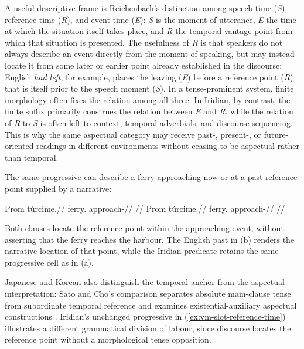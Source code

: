 A useful descriptive frame is Reichenbach's distinction among speech time
(\textit{S}), reference time (\textit{R}), and event time (\textit{E}):
\textit{S} is the moment of utterance, \textit{E} the time at which the
situation itself takes place, and \textit{R} the temporal vantage point from
which that situation is presented. The usefulness of \textit{R} is that speakers
do not always describe an event directly from the moment of speaking, but may
instead locate it from some later or earlier point already established in the
discourse; English \textit{had left}, for example, places the leaving
(\textit{E}) before a reference point (\textit{R}) that is itself prior to the
speech moment (\textit{S}). In a tense-prominent system, finite morphology often
fixes the relation among all three. In Iridian, by contrast, the finite suffix
primarily construes the relation between \textit{E} and \textit{R}, while the
relation of \textit{R} to \textit{S} is often left to context, temporal
adverbials, and discourse sequencing. This is why the same aspectual category
may receive past-, present-, or future-oriented readings in different
environments without ceasing to be aspectual rather than temporal.

The same progressive can describe a ferry approaching now or at a
past reference point supplied by a narrative:

\pex\label{ex:vm-slot-reference-time}
\a
\begingl
\gla Prom túrcime.//
\glb ferry.\Dir{} approach-\Prog{}//
\glft {}
//
\endgl
\a
\begingl
\gla Prom túrcime.//
\glb ferry.\Dir{} approach-\Prog{}//
\glft {}
//
\endgl
\xe

Both clauses locate the reference point within the approaching event,
without asserting that the ferry reaches the harbour. The English past in
(b) renders the narrative location of that point, while the Iridian
predicate retains the same progressive cell as in (a).

Japanese and Korean also distinguish the temporal anchor from the
aspectual interpretation: Sato and Cho's comparison separates absolute
main-clause tense from subordinate temporal reference and examines
existential-auxiliary aspectual constructions \cite{satocho2024aspect}.
Iridian's unchanged progressive in (\ref{ex:vm-slot-reference-time})
illustrates a different grammatical division of labour, since discourse
locates the reference point without a morphological tense opposition.


